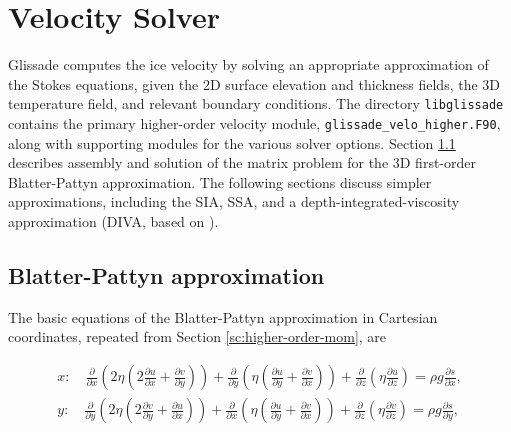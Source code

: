
\section{Velocity Solver}
\label{sc:glissade-velocity}

Glissade computes the ice velocity by solving an appropriate
approximation of the Stokes equations, given the 2D surface elevation and thickness fields,
the 3D temperature field, and relevant boundary conditions.
The directory \texttt{libglissade} contains the primary higher-order velocity module,
\texttt{glissade\_velo\_higher.F90}, along with supporting modules for the various solver options.
Section \ref{sc:glissade-blatter-pattyn} describes assembly and solution of the matrix problem for the 
3D first-order Blatter-Pattyn approximation.  
The following sections discuss simpler approximations, including the SIA, SSA, and
a depth-integrated-viscosity approximation (DIVA, based on \citet{Goldberg2011}).

\subsection{Blatter-Pattyn approximation}
\label{sc:glissade-blatter-pattyn}

The basic equations of the Blatter-Pattyn approximation in Cartesian coordinates, repeated from 
Section \ref{sc:higher-order-mom}, are 

\begin{equation}
  \label{gliss.eq.stress_balance}
  \begin{split}
    x: \quad \frac{\partial }{\partial x}\left( 2 \eta \left(2\frac{\partial u}{\partial x} +  \frac{\partial v}{\partial y} \right) \right) 
    + \frac{\partial }{\partial y}\left( \eta \left( \frac{\partial u}{\partial y} + \frac{\partial v}{\partial x} \right) \right) 
    +\frac{\partial }{\partial z}\left( \eta \frac{\partial u}{\partial z} \right) = \rho g\frac{\partial s}{\partial x}, \\
    y: \quad \frac{\partial }{\partial y}\left( 2 \eta \left( 2\frac{\partial v}{\partial y} + \frac{\partial u}{\partial x} \right) \right) 
    + \frac{\partial }{\partial x}\left( \eta \left( \frac{\partial u}{\partial y} + \frac{\partial v}{\partial x} \right) \right) 
    +\frac{\partial }{\partial z}\left( \eta \frac{\partial v}{\partial z} \right) = \rho g\frac{\partial s}{\partial y},  \\
  \end{split}
\end{equation}

